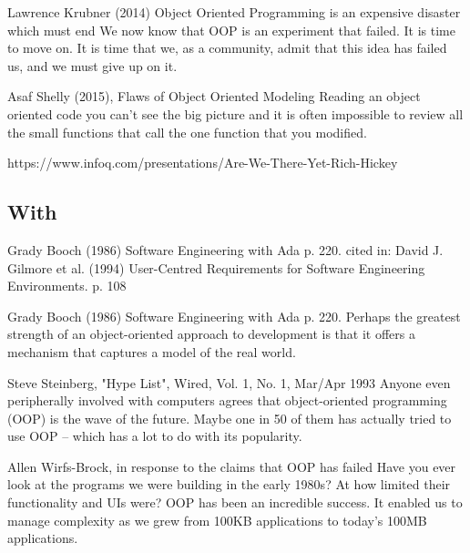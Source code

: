 \documentclass[12pt]{book}
\begin{document}
\begin{kodequote}{Lawrence Krubner (2014)}
	Object Oriented Programming is an expensive disaster which must end
	We now know that OOP is an experiment that failed. It is time to move on. It is time that we, as a community, admit that this idea has failed us, and we must give up on it.
\end{kodequote}

\begin{kodequote}{Asaf Shelly (2015), Flaws of Object Oriented Modeling}
	Reading an object oriented code you can't see the big picture and it is often impossible to review all the small functions that call the one function that you modified.
\end{kodequote}


https://www.infoq.com/presentations/Are-We-There-Yet-Rich-Hickey


\subsection{With}

Grady Booch (1986) Software Engineering with Ada p. 220. cited in: David J. Gilmore et al. (1994) User-Centred Requirements for Software Engineering Environments. p. 108
\begin{kodequote}{Grady Booch (1986) Software Engineering with Ada p. 220. }
	Perhaps the greatest strength of an object-oriented approach to development is that it offers a mechanism that captures a model of the real world.
\end{kodequote}


\begin{kodequote}{Steve Steinberg, "Hype List", Wired, Vol. 1, No. 1, Mar/Apr 1993}
	Anyone even peripherally involved with computers agrees that object-oriented programming (OOP) is the wave of the future. Maybe one in 50 of them has actually tried to use OOP – which has a lot to do with its popularity.
\end{kodequote}

\begin{kodequote}{Allen Wirfs-Brock, in response to the claims that OOP has failed}
	Have you ever look at the programs we were building in the early 1980s? At how limited their functionality and UIs were? OOP has been an incredible success. It enabled us to manage complexity as we grew from 100KB applications to today’s 100MB applications.
\end{kodequote}



\ifx\wholebook\relax\else
% 
% 
	
\end{document}
